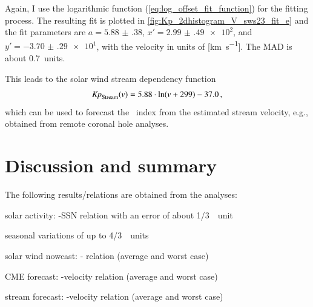 Again, I use the logarithmic function (\ref{eq:log_offset_fit_function}) for the fitting process. The resulting fit is plotted in \autoref{fig:Kp_2dhistogram_V_sws23_fit_e} and the fit parameters are $a = \num{5.88(38)}$, $x' = \num{2.99(49)e2}$, and $y' = \num{-3.70(29)e1}$, with the velocity in units of [\si{\km\per\s}]. The MAD is about \SI{0.7}{\Kp}~units.
\begin{figure}
\end{figure}
This leads to the solar wind stream dependency function
\begin{align}
	\textit{Kp}_\text{Stream}(v) = 5.88 \cdot \ln(v + 299) - 37.0	\,,	\label{eq:kpvsv_stream_dependency_function}
\end{align}
which can be used to forecast the \Kp{}~index from the estimated stream velocity, e.g., obtained from remote coronal hole analyses.


\section{Discussion and summary}
The following results/relations are obtained from the analyses:
\begin{itemize*}
	\item solar activity: \Kp{}-SSN relation with an error of about 1/3~\Kp{}~unit
	\item seasonal variations of up to 4/3~\Kp{}~units
	\item solar wind nowcast: \Kp-\vBz{} relation (average and worst case)
	\item CME forecast: \Kp-velocity relation (average and worst case)
	\item stream forecast: \Kp-velocity relation (average and worst case)
\end{itemize*}

